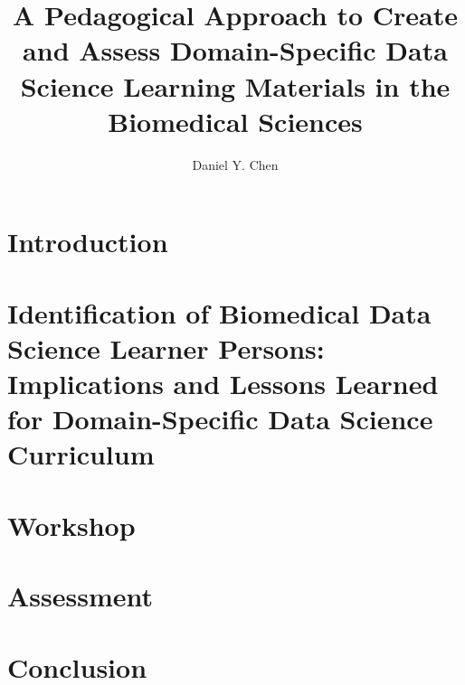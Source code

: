 \documentclass[doublespace,draft,nopageskip]{VTthesis} %
\title{A Pedagogical Approach
       to Create and Assess
       Domain-Specific
       Data Science Learning Materials
       in the Biomedical Sciences}
\author{Daniel Y. Chen}
\begin{document}
  \frontmatter
  \maketitle
  \tableofcontents

	\listoffigures
	\listoftables
    \printnomenclature %
    

	\mainmatter

	\chapter{Introduction} \label{ch:introduction}
        

    \chapter{Identification of Biomedical Data Science Learner Persons:
             Implications and Lessons Learned for Domain-Specific Data Science Curriculum}
        \label{ch:persona_validation}
        

    \chapter{Workshop} \label{ch:workshop}
        

    \chapter{Assessment} \label{ch:assessment}
        

    \chapter{Conclusion} \label{ch:conclusion}
\end{document}
